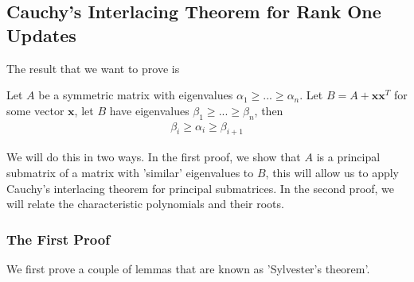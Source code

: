 \documentclass{math}
\renewcommand{\vec}[1]{\boldsymbol{#1}}
\begin{document}
\subsection{Cauchy's Interlacing Theorem for Rank One Updates}

The result that we want to prove is

\begin{theorem}
    Let $A$ be a symmetric matrix with eigenvalues $\alpha_1 \geq ... \geq \alpha_n$.
    Let $B = A + \vec{x} \vec{x}^T$ for some vector $\vec{x}$, let $B$ have eigenvalues $\beta_1 \geq ... \geq \beta_n$, then
    \begin{align*}
        \beta_i \geq \alpha_i \geq \beta_{i + 1}
    \end{align*}
\end{theorem}

We will do this in two ways. In the first proof, we show that $A$ is a principal submatrix of a matrix with 'similar' eigenvalues to $B$,
this will allow us to apply Cauchy's interlacing theorem for principal submatrices.
In the second proof, we will relate the characteristic polynomials and their roots.

\subsubsection{The First Proof}

We first prove a couple of lemmas that are known as 'Sylvester's theorem'.
\end{document}
